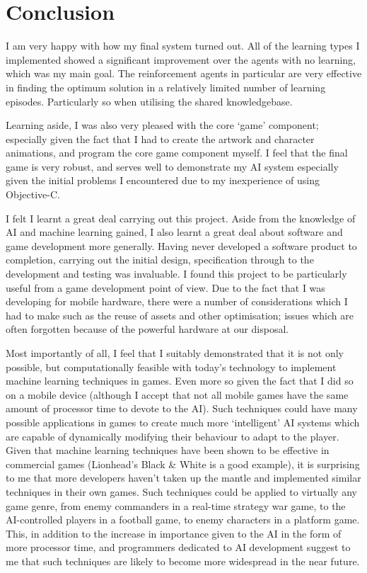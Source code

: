 \documentclass[a4paper,oneside]{report}
\begin{document}
\section{Conclusion}

I am very happy with how my final system turned out. All of the learning types I implemented showed a significant improvement over the agents with no learning, which was my main goal. The reinforcement agents in particular are very effective in finding the optimum solution in a relatively limited number of learning episodes. Particularly so when utilising the shared knowledgebase. 

Learning aside, I was also very pleased with the core `game' component; especially given the fact that I had to create the artwork and character animations, and program the core game component myself. I feel that the final game is very robust, and serves well to demonstrate my AI system especially given the initial problems I encountered due to my inexperience of using Objective-C.

I felt I learnt a great deal carrying out this project. Aside from the knowledge of AI and machine learning gained, I also learnt a great deal about software and game development more generally. Having never developed a software product to completion, carrying out the initial design, specification through to the development and testing was invaluable. I found this project to be particularly useful from a game development point of view. Due to the fact that I was developing for mobile hardware, there were a number of considerations which I had to make such as the reuse of assets and other optimisation; issues which are often forgotten because of the powerful hardware at our disposal.

Most importantly of all, I feel that I suitably demonstrated that it is not only possible, but computationally feasible with today's technology to implement machine learning techniques in games. Even more so given the fact that I did so on a mobile device (although I accept that not all mobile games have the same amount of processor time to devote to the AI). Such techniques could have many possible applications in games to create much more `intelligent' AI systems which are capable of dynamically modifying their behaviour to adapt to the player. Given that machine learning techniques have been shown to be effective in commercial games (Lionhead's Black \& White is a good example), it is surprising to me that more developers haven't taken up the mantle and implemented similar techniques in their own games. Such techniques could be applied to virtually any game genre, from enemy commanders in a real-time strategy war game, to the AI-controlled players in a football game, to enemy characters in a platform game. This, in addition to the increase in importance given to the AI in the form of more processor time, and programmers dedicated to AI development suggest to me that such techniques are likely to become more widespread in the near future. 
\end{document}
